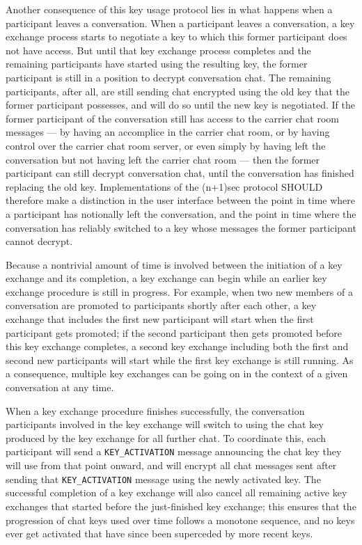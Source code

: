 \documentclass{article}
\def\message#1{\texttt{#1}}
\begin{document}
Another consequence of this key usage protocol lies in what happens when a participant leaves a conversation.
When a participant leaves a conversation, a key exchange process starts to negotiate a key to which this former participant does not have access.
But until that key exchange process completes and the remaining participants have started using the resulting key, the former participant is still in a position to decrypt conversation chat.
The remaining participants, after all, are still sending chat encrypted using the old key that the former participant possesses, and will do so until the new key is negotiated.
If the former participant of the conversation still has access to the carrier chat room messages --- by having an accomplice in the carrier chat room, or by having control over the carrier chat room server, or even simply by having left the conversation but not having left the carrier chat room --- then the former participant can still decrypt conversation chat, until the conversation has finished replacing the old key.
Implementations of the (n+1)sec protocol SHOULD therefore make a distinction in the user interface between the point in time where a participant has notionally left the conversation, and the point in time where the conversation has reliably switched to a key whose messages the former participant cannot decrypt.

Because a nontrivial amount of time is involved between the initiation of a key exchange and its completion, a key exchange can begin while an earlier key exchange procedure is still in progress.
For example, when two new members of a conversation are promoted to participants shortly after each other, a key exchange that includes the first new participant will start when the first participant gets promoted; if the second participant then gets promoted before this key exchange completes, a second key exchange including both the first and second new participants will start while the first key exchange is still running.
As a consequence, multiple key exchanges can be going on in the context of a given conversation at any time.

When a key exchange procedure finishes successfully, the conversation participants involved in the key exchange will switch to using the chat key produced by the key exchange for all further chat.
To coordinate this, each participant will send a \message{KEY\_ACTIVATION} message announcing the chat key they will use from that point onward, and will encrypt all chat messages sent after sending that \message{KEY\_ACTIVATION} message using the newly activated key.
The successful completion of a key exchange will also cancel all remaining active key exchanges that started before the just-finished key exchange; this ensures that the progression of chat keys used over time follows a monotone sequence, and no keys ever get activated that have since been superceded by more recent keys.
\end{document}
